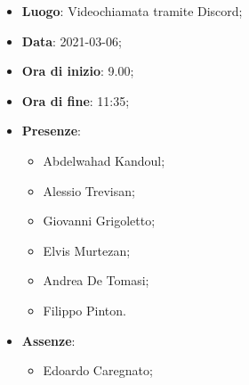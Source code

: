 \begin{itemize}
    \item \textbf{Luogo}: Videochiamata tramite Discord;
    \item \textbf{Data}: 2021-03-06;
    \item \textbf{Ora di inizio}: 9.00;
    \item \textbf{Ora di fine}: 11:35;
    \item \textbf{Presenze}:
          \begin{itemize}
            \item Abdelwahad Kandoul;
            \item Alessio Trevisan;
            \item Giovanni Grigoletto;
            \item Elvis Murtezan;
            \item Andrea De Tomasi;
            \item Filippo Pinton.
          \end{itemize}
    \item \textbf{Assenze}:
          \begin{itemize}
            \item Edoardo Caregnato;
          \end{itemize}
\end{itemize}